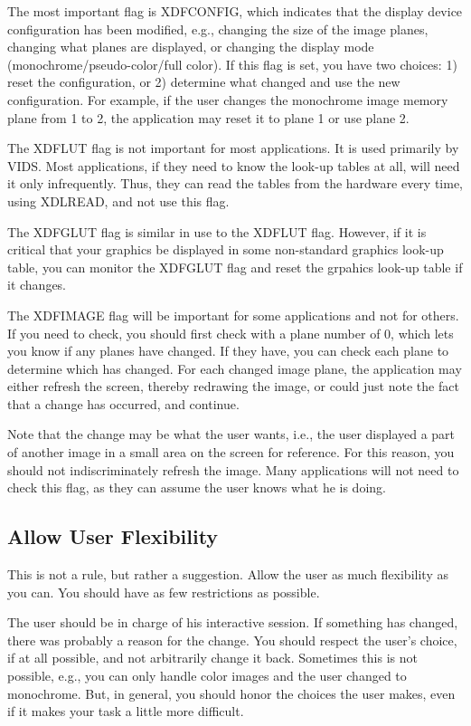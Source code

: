 The most important flag is XDFCONFIG, which indicates that the display
device configuration has been modified, e.g., changing the size of the
image planes, changing what planes are displayed, or changing the display
mode (monochrome/pseudo-color/full color).  If this flag is set, you have
two choices:  1) reset the configuration, or 2) determine what changed
and use the new configuration.  For example, if the user changes the
monochrome image memory plane from 1 to 2, the application may reset it
to plane 1 or use plane 2.

The XDFLUT flag is not important for most applications.  It is used
primarily by VIDS.  Most applications, if they need to know the look-up
tables at all, will need it only infrequently.  Thus, they can read the
tables from the hardware every time, using XDLREAD, and not use this flag.

The XDFGLUT flag is similar in use to the XDFLUT flag.  However, if
it is critical that your graphics be displayed in some non-standard
graphics look-up table, you can monitor the XDFGLUT flag and reset the
grpahics look-up table if it changes.

The XDFIMAGE flag will be important for some applications and not for
others.  If you need to check, you should first check with a plane number
of 0, which lets you know if any planes have changed.  If they have, you
can check each plane to determine which has changed.  For each changed
image plane, the application may either refresh the screen, thereby
redrawing the image, or could just note the fact that a change has
occurred, and continue.

Note that the change may be what the user wants, i.e., the
user displayed a part of another image in a small area on the screen for
reference.  For this reason, you should not indiscriminately refresh the
image.  Many applications will not need to check this flag, as they can
assume the user knows what he is doing.
\subsection{Allow User Flexibility}
This is not a rule, but rather a suggestion.  Allow the user as much
flexibility as you can.  You should have as few restrictions as possible.

The user should be in charge of his interactive session.  If something
has changed, there was probably a reason for the change.  You
should respect the user's choice, if at all possible, and not arbitrarily
change it back.  Sometimes this is not possible, e.g., you can only
handle color images and the user changed to monochrome.  But, in
general, you should honor the choices the user makes, even if it makes
your task a little more difficult.

